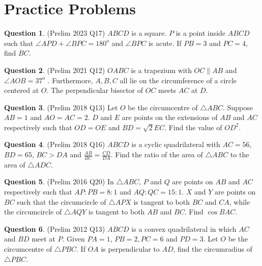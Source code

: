 \documentclass{article}
\theoremstyle{definition}
\newtheorem{question}{Question}
\begin{document}
	\section{Practice Problems}
	\begin{question}
		(Prelim 2023 Q17) $ABCD$ is a square. $P$ is a point inside $ABCD$ such that $\angle APD + \angle BPC = 180^o$ and  $\angle BPC$ is acute.  If $PB = 3$ and $PC = 4$, find $BC$.
	\end{question}
	\vfill
	\begin{question}
		(Prelim 2021 Q12) $OABC$ is a trapezium with $OC \parallel AB$ and $\angle AOB = 37^o$	. Furthermore, $A,B,C$ all lie on the circumference of a circle centered at $O$. The perpendicular bisector of $OC$ meets $AC$ at $D$.
	\end{question}
	\vfill
	\newpage
	\begin{question}
		(Prelim 2018 Q13) Let $O$ be the circumcentre of $\triangle ABC$. Suppose $AB = 1$ and $AO = AC = 2$. $D$ and $E$ are points on the extensions of $AB$ and $A C$ respectively such that $OD = OE $ and $BD = \sqrt{2} EC$. Find the value of $OD^2$.
	\end{question}
	\vfill
	\begin{question}
		(Prelim 2018 Q16) $ABCD$ is a cyclic quadrilateral with $AC=56$, $BD=65$, $BC>DA$ and $\frac{AB}{BC} = \frac{CD}{DA}$. Find the ratio of the area of $\triangle ABC$ to the area of $\triangle ADC$.
	\end{question}
	\vfill
	\newpage
	\begin{question}
		(Prelim 2016 Q20) In $\triangle ABC$, $P$ and $Q$ are points on $AB$ and $AC$ respectively such that $AP:PB=8:1$ and $AQ:QC=15:1$.  $X$ and $Y$ are points on $BC$ such that the circumcircle of $\triangle APX$ is tangent to both $BC$ and $CA$, while the circumcircle of  $\triangle AQY$ is tangent to both $AB$ and $BC$. Find $\cos BAC$.
	\end{question}
	\vfill
	\begin{question}
		(Prelim 2012 Q13) $A B C D$ is a convex quadrilateral in which $A C$ and $B D$ meet at $P$. Given $P A=1$, $P B=2, P C=6$ and $P D=3$. Let $O$ be the circumcentre of $\triangle P B C$. If $O A$ is perpendicular to $A D$, find the circumradius of $\triangle P B C$.
	\end{question}
	\vfill
\end{document}
